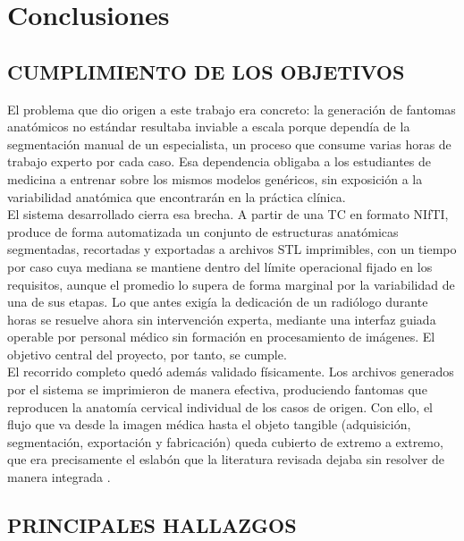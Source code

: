 \chapter{Conclusiones}
\label{ch:conclusiones}

\section{CUMPLIMIENTO DE LOS OBJETIVOS}

El problema que dio origen a este trabajo era concreto: la generación de fantomas anatómicos no estándar resultaba inviable a escala porque dependía de la segmentación manual de un especialista, un proceso que consume varias horas de trabajo experto por cada caso. Esa dependencia obligaba a los estudiantes de medicina a entrenar sobre los mismos modelos genéricos, sin exposición a la variabilidad anatómica que encontrarán en la práctica clínica.\\

El sistema desarrollado cierra esa brecha. A partir de una TC en formato NIfTI, produce de forma automatizada un conjunto de estructuras anatómicas segmentadas, recortadas y exportadas a archivos STL imprimibles, con un tiempo por caso cuya mediana se mantiene dentro del límite operacional fijado en los requisitos, aunque el promedio lo supera de forma marginal por la variabilidad de una de sus etapas. Lo que antes exigía la dedicación de un radiólogo durante horas se resuelve ahora sin intervención experta, mediante una interfaz guiada operable por personal médico sin formación en procesamiento de imágenes. El objetivo central del proyecto, por tanto, se cumple.\\

El recorrido completo quedó además validado físicamente. Los archivos generados por el sistema se imprimieron de manera efectiva, produciendo fantomas que reproducen la anatomía cervical individual de los casos de origen. Con ello, el flujo que va desde la imagen médica hasta el objeto tangible (adquisición, segmentación, exportación y fabricación) queda cubierto de extremo a extremo, que era precisamente el eslabón que la literatura revisada dejaba sin resolver de manera integrada \citep{bucking2017workflow}.\\

\section{PRINCIPALES HALLAZGOS}

